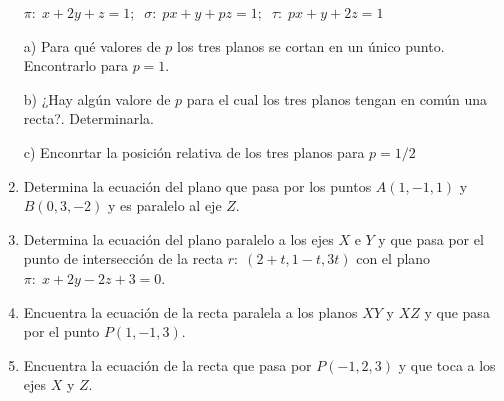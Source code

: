 \begin{enumerate}
$\pi:\; x+2y+z=1;\;\; \sigma:\; px+y+pz=1;\;\;\tau:\;px+y+2z=1$

a) Para qué valores de $p$ los tres planos se cortan en un único punto. Encontrarlo para $p=1$.

b) ¿Hay algún valore de $p$ para el cual los tres planos tengan en común una recta?. Determinarla.

c) Enconrtar la posición relativa de los tres planos para $p=1/2$

\vspace{2mm} 



\item Determina la ecuación del plano que pasa por los puntos $A(1,-1,1)$ y $B(0,3,-2)$ y es paralelo al eje $Z$.

\vspace{2mm} 

\item Determina la ecuación del plano paralelo a los ejes $X$ e $Y$ y que pasa por el punto de intersección de la recta $r:\; (2+t,1-t,3t)$ con el plano $\pi:\; x+2y-2z+3=0$.

\vspace{2mm} 

\item Encuentra la ecuación de la recta paralela a los planos $XY$ y $XZ$ y que pasa por el punto $P(1,-1,3)$.

\vspace{2mm} 

\item Encuentra la ecuación de la recta que pasa por $P(-1,2,3)$ y que toca a los ejes $X$ y $Z$.


\end{enumerate}
